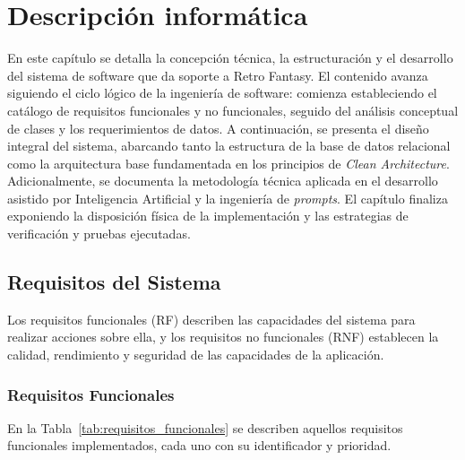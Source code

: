 \chapter{Descripción informática}
\label{chap:descripcion_informatica}

En este capítulo se detalla la concepción técnica, la estructuración y el desarrollo del sistema de software que da soporte a Retro Fantasy. El contenido avanza siguiendo el ciclo lógico de la ingeniería de software: comienza estableciendo el catálogo de requisitos funcionales y no funcionales, seguido del análisis conceptual de clases y los requerimientos de datos. A continuación, se presenta el diseño integral del sistema, abarcando tanto la estructura de la base de datos relacional como la arquitectura base fundamentada en los principios de \textit{Clean Architecture}. Adicionalmente, se documenta la metodología técnica aplicada en el desarrollo asistido por Inteligencia Artificial y la ingeniería de \textit{prompts}. El capítulo finaliza exponiendo la disposición física de la implementación y las estrategias de verificación y pruebas ejecutadas.



\section{Requisitos del Sistema}
\label{sec:requisitos}

Los requisitos funcionales (RF) describen las capacidades del sistema para realizar acciones sobre ella, y los requisitos no funcionales (RNF) establecen la calidad, rendimiento y seguridad de las capacidades de la aplicación.

\subsection{Requisitos Funcionales}
En la Tabla~\ref{tab:requisitos_funcionales} se describen aquellos requisitos funcionales implementados, cada uno con su identificador y prioridad.

